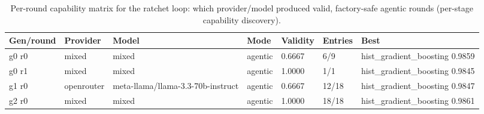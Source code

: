\begin{table}[H]
\centering\small
\caption{Per-round capability matrix for the ratchet loop: which provider/model produced valid, factory-safe agentic rounds (per-stage capability discovery).}
\label{tab:ratchet-rounds-ratchet-ledger-sp500}
\begin{tabular}{lllllll}
\toprule
Gen/round & Provider & Model & Mode & Validity & Entries & Best \\
\midrule
g0 r0 & mixed & mixed & agentic & 0.6667 & 6/9 & hist\_gradient\_boosting 0.9859 \\
g0 r1 & mixed & mixed & agentic & 1.0000 & 1/1 & hist\_gradient\_boosting 0.9845 \\
g1 r0 & openrouter & meta-llama/llama-3.3-70b-instruct & agentic & 0.6667 & 12/18 & hist\_gradient\_boosting 0.9847 \\
g2 r0 & mixed & mixed & agentic & 1.0000 & 18/18 & hist\_gradient\_boosting 0.9861 \\
\bottomrule
\end{tabular}
\end{table}
